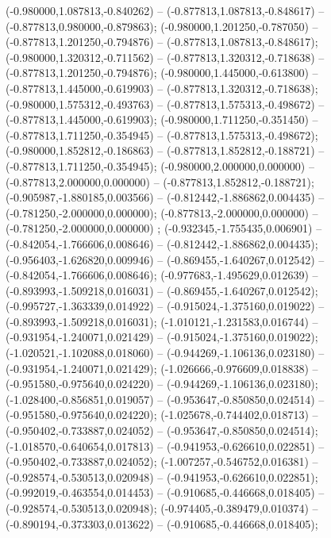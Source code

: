  (-0.980000,1.087813,-0.840262) -- (-0.877813,1.087813,-0.848617) -- (-0.877813,0.980000,-0.879863);
 (-0.980000,1.201250,-0.787050) -- (-0.877813,1.201250,-0.794876) -- (-0.877813,1.087813,-0.848617);
 (-0.980000,1.320312,-0.711562) -- (-0.877813,1.320312,-0.718638) -- (-0.877813,1.201250,-0.794876);
 (-0.980000,1.445000,-0.613800) -- (-0.877813,1.445000,-0.619903) -- (-0.877813,1.320312,-0.718638);
 (-0.980000,1.575312,-0.493763) -- (-0.877813,1.575313,-0.498672) -- (-0.877813,1.445000,-0.619903);
 (-0.980000,1.711250,-0.351450) -- (-0.877813,1.711250,-0.354945) -- (-0.877813,1.575313,-0.498672);
 (-0.980000,1.852812,-0.186863) -- (-0.877813,1.852812,-0.188721) -- (-0.877813,1.711250,-0.354945);
 (-0.980000,2.000000,0.000000) -- (-0.877813,2.000000,0.000000) -- (-0.877813,1.852812,-0.188721);
 (-0.905987,-1.880185,0.003566) -- (-0.812442,-1.886862,0.004435) -- (-0.781250,-2.000000,0.000000);
 (-0.877813,-2.000000,0.000000) -- (-0.781250,-2.000000,0.000000) ;
 (-0.932345,-1.755435,0.006901) -- (-0.842054,-1.766606,0.008646) -- (-0.812442,-1.886862,0.004435);
 (-0.956403,-1.626820,0.009946) -- (-0.869455,-1.640267,0.012542) -- (-0.842054,-1.766606,0.008646);
 (-0.977683,-1.495629,0.012639) -- (-0.893993,-1.509218,0.016031) -- (-0.869455,-1.640267,0.012542);
 (-0.995727,-1.363339,0.014922) -- (-0.915024,-1.375160,0.019022) -- (-0.893993,-1.509218,0.016031);
 (-1.010121,-1.231583,0.016744) -- (-0.931954,-1.240071,0.021429) -- (-0.915024,-1.375160,0.019022);
 (-1.020521,-1.102088,0.018060) -- (-0.944269,-1.106136,0.023180) -- (-0.931954,-1.240071,0.021429);
 (-1.026666,-0.976609,0.018838) -- (-0.951580,-0.975640,0.024220) -- (-0.944269,-1.106136,0.023180);
 (-1.028400,-0.856851,0.019057) -- (-0.953647,-0.850850,0.024514) -- (-0.951580,-0.975640,0.024220);
 (-1.025678,-0.744402,0.018713) -- (-0.950402,-0.733887,0.024052) -- (-0.953647,-0.850850,0.024514);
 (-1.018570,-0.640654,0.017813) -- (-0.941953,-0.626610,0.022851) -- (-0.950402,-0.733887,0.024052);
 (-1.007257,-0.546752,0.016381) -- (-0.928574,-0.530513,0.020948) -- (-0.941953,-0.626610,0.022851);
 (-0.992019,-0.463554,0.014453) -- (-0.910685,-0.446668,0.018405) -- (-0.928574,-0.530513,0.020948);
 (-0.974405,-0.389479,0.010374) -- (-0.890194,-0.373303,0.013622) -- (-0.910685,-0.446668,0.018405);
